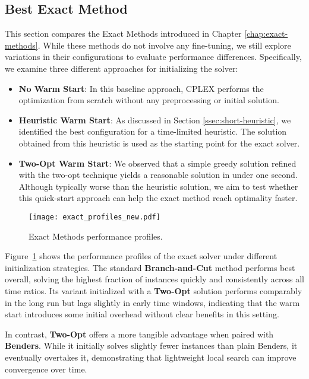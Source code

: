 \subsection{Best Exact Method}

This section compares the Exact Methods introduced in Chapter \ref{chap:exact-methods}. While these methods do not involve any fine-tuning, we still explore variations in their configurations to evaluate performance differences. Specifically, we examine three different approaches for initializing the solver:

\begin{itemize}
\item \textbf{No Warm Start}: In this baseline approach, CPLEX performs the optimization from scratch without any preprocessing or initial solution.
\item \textbf{Heuristic Warm Start}: As discussed in Section \ref{ssec:short-heuristic}, we identified the best configuration for a time-limited heuristic. The solution obtained from this heuristic is used as the starting point for the exact solver.
\item \textbf{Two-Opt Warm Start}: We observed that a simple greedy solution refined with the two-opt technique yields a reasonable solution in under one second. Although typically worse than the heuristic solution, we aim to test whether this quick-start approach can help the exact method reach optimality faster.
\end{itemize}

\begin{figure}[H]
  \centering
  \texttt{[image: exact\_profiles\_new.pdf]}
  \caption{Exact Methods performance profiles.}
  \label{fig:exact}
\end{figure}

Figure~\ref{fig:exact} shows the performance profiles of the exact solver under different initialization strategies. The standard \textbf{Branch-and-Cut} method performs best overall, solving the highest fraction of instances quickly and consistently across all time ratios. Its variant initialized with a \textbf{Two-Opt} solution performs comparably in the long run but lags slightly in early time windows, indicating that the warm start introduces some initial overhead without clear benefits in this setting.

In contrast, \textbf{Two-Opt} offers a more tangible advantage when paired with \textbf{Benders}. While it initially solves slightly fewer instances than plain Benders, it eventually overtakes it, demonstrating that lightweight local search can improve convergence over time.

